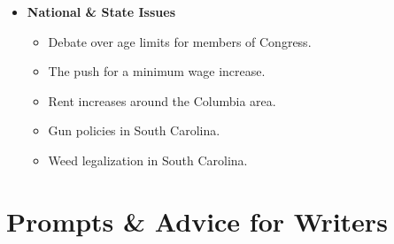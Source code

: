 \documentclass{article}
\begin{document}
\begin{itemize}
\begin{itemize}
    \begin{itemize}
    \item
      \emph{Angle:} Explore modern alternatives like online purchasing
      through Amazon.
    \end{itemize}
  \item
    The rebranding of Twitter to X.

    \begin{itemize}
    \item
      \emph{Angle:} Congress is investigating the wrong social media
      platform (TikTok)
    \end{itemize}
  \end{itemize}
\item
  \textbf{National \& State Issues}

  \begin{itemize}
  \item
    Debate over age limits for members of Congress.
  \item
    The push for a minimum wage increase.
  \item
    Rent increases around the Columbia area.
  \item
    Gun policies in South Carolina.
  \item
    Weed legalization in South Carolina.
  \end{itemize}
\end{itemize}

\section*{Prompts \& Advice for Writers}
\end{document}
